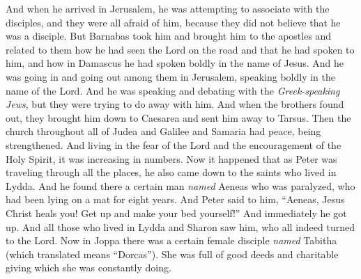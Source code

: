 \begin{biblechapter}
 And when he arrived in Jerusalem, he was attempting to associate with the disciples, and they were all afraid of him, because they did not believe that he was a disciple.
\verse But Barnabas took him and brought him to the apostles and related to them how he had seen the Lord on the road and that he had spoken to him, and how in Damascus he had spoken boldly in the name of Jesus.
\verse And he was going in and going out among them in Jerusalem, speaking boldly in the name of the Lord.
\verse And he was speaking and debating with the \textit{Greek-speaking Jews}, but they were trying to do away with him.
\verse And when the brothers found out, they brought him down to Caesarea and sent him away to Tarsus.
\verse Then the church throughout all of Judea and Galilee and Samaria had peace, being strengthened. And living in the fear of the Lord and the encouragement of the Holy Spirit, it was increasing in numbers.
 Now it happened that as Peter was traveling through all the places, he also came down to the saints who lived in Lydda.
\verse And he found there a certain man \textit{named} Aeneas who was paralyzed, who had been lying on a mat for eight years.
\verse And Peter said to him, “Aeneas, Jesus Christ heals you! Get up and make your bed yourself!” And immediately he got up.
\verse And all those who lived in Lydda and Sharon saw him, who all indeed turned to the Lord.
 Now in Joppa there was a certain female disciple \textit{named} Tabitha (which translated means “Dorcas”). She was full of good deeds and charitable giving which she was constantly doing.

\end{biblechapter}

